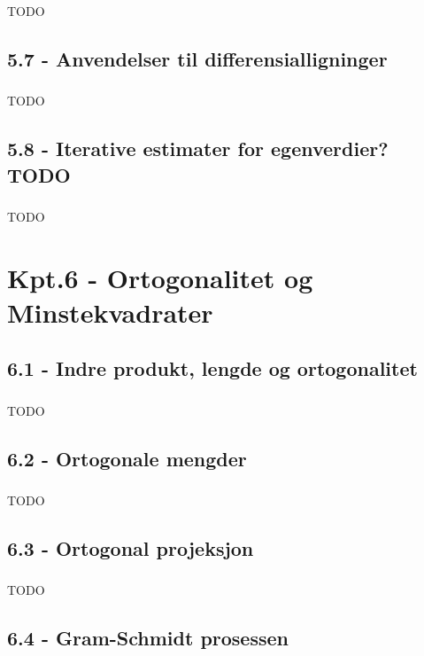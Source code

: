 \documentclass{article}
\begin{document}
      \subsubsection{}
        TODO
    \subsection{5.7 - Anvendelser til differensialligninger}
      \subsubsection{}
        TODO
    \subsection{5.8 - Iterative estimater for egenverdier? TODO}
      \subsubsection{}
        TODO
  \section{Kpt.6 - Ortogonalitet og Minstekvadrater}
    \subsection{6.1 - Indre produkt, lengde og ortogonalitet}
      \subsubsection{}
        TODO
    \subsection{6.2 - Ortogonale mengder}
      \subsubsection{}
        TODO
    \subsection{6.3 - Ortogonal projeksjon}
      \subsubsection{}
        TODO
    \subsection{6.4 - Gram-Schmidt prosessen}
\end{document}
